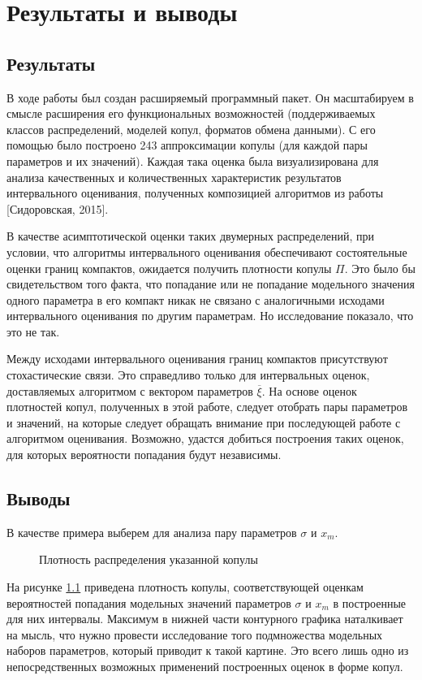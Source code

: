 \chapter{Результаты и выводы}	%

\section*{Результаты}

В ходе работы был создан расширяемый программный пакет. Он масштабируем в смысле расширения его функциональных возможностей (поддерживаемых классов распределений, моделей копул, форматов обмена данными). С его помощью было построено 243 аппроксимации копулы (для каждой пары параметров и их значений). Каждая така оценка была визуализирована для анализа качественных и количественных характеристик результатов интервального оценивания, полученных композицией алгоритмов из работы [Сидоровская, 2015].

В качестве асимптотической оценки таких двумерных распределений, при условии, что алгоритмы интервального оценивания обеспечивают состоятельные оценки границ компактов, ожидается получить плотности копулы $\Pi$. Это было бы свидетельством того факта, что попадание или не попадание модельного значения одного параметра в его компакт никак не связано с аналогичными исходами интервального оценивания по другим параметрам. Но исследование показало, что это не так.

Между исходами интервального оценивания границ компактов присутствуют стохастические связи.
Это справедливо только для интервальных оценок, доставляемых алгоритмом с вектором параметров $\overline{\xi}$. На основе оценок плотностей копул, полученных в этой работе, следует отобрать пары параметров и значений, на которые следует обращать внимание при последующей работе с алгоритмом оценивания. Возможно, удастся добиться построения таких оценок, для которых вероятности попадания будут независимы.


\section*{Выводы}

В качестве примера выберем для анализа пару параметров $\sigma$ и $x_m$.
\begin{figure}[h]
	{}
	\caption{ Плотность распределения указанной копулы}
	\label{fig:smallxm}
\end{figure}
На рисунке \ref{fig:smallxm} приведена плотность копулы, соответствующей оценкам вероятностей попадания модельных значений параметров $\sigma$ и $x_m$ в построенные для них интервалы.
Максимум в нижней части контурного графика наталкивает на мысль, что нужно провести исследование того подмножества модельных наборов параметров, который приводит к такой картине. Это всего лишь одно из непосредственных возможных применений построенных оценок в форме копул.

